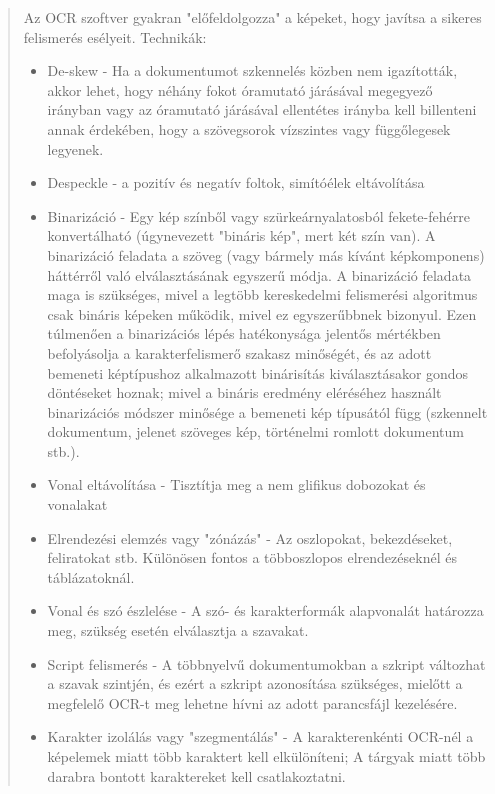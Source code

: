 \begin{quotation}
	Az OCR szoftver gyakran "előfeldolgozza" a képeket, hogy javítsa a sikeres felismerés esélyeit. Technikák:
	\begin{itemize}
		\item De-skew - Ha a dokumentumot szkennelés közben nem igazították, akkor lehet, hogy néhány fokot óramutató járásával megegyező irányban vagy az óramutató járásával ellentétes irányba
		kell billenteni annak érdekében, hogy a szövegsorok vízszintes vagy függőlegesek legyenek.
		
		\item Despeckle - a pozitív és negatív foltok, simítóélek eltávolítása
		
		\item Binarizáció - Egy kép színből vagy szürkeárnyalatosból fekete-fehérre konvertálható (úgynevezett "bináris kép", mert két szín van). A binarizáció feladata a szöveg (vagy bármely
		más kívánt képkomponens) háttérről való elválasztásának egyszerű módja. A binarizáció feladata maga is szükséges, mivel a legtöbb kereskedelmi felismerési algoritmus csak bináris képeken működik, mivel ez egyszerűbbnek bizonyul. Ezen túlmenően a binarizációs lépés hatékonysága jelentős mértékben befolyásolja a karakterfelismerő szakasz minőségét, és az adott bemeneti képtípushoz alkalmazott binárisítás kiválasztásakor gondos döntéseket hoznak; mivel a bináris eredmény eléréséhez használt binarizációs módszer minősége a bemeneti kép típusától függ (szkennelt dokumentum, jelenet szöveges kép, történelmi romlott dokumentum stb.).
		
		\item Vonal eltávolítása - Tisztítja meg a nem glifikus dobozokat és vonalakat
		
		\item Elrendezési elemzés vagy "zónázás" - Az oszlopokat, bekezdéseket, feliratokat stb. Különösen fontos a többoszlopos elrendezéseknél és táblázatoknál.
		
		\item Vonal és szó észlelése - A szó- és karakterformák alapvonalát határozza meg, szükség esetén elválasztja a szavakat.
		
		\item Script felismerés - A többnyelvű dokumentumokban a szkript változhat a szavak szintjén, és ezért a szkript azonosítása szükséges, mielőtt a megfelelő OCR-t meg lehetne hívni az
		adott parancsfájl kezelésére.
		
		\item Karakter izolálás vagy "szegmentálás" - A karakterenkénti OCR-nél a képelemek miatt több karaktert kell elkülöníteni; A tárgyak miatt több darabra bontott karaktereket kell
		csatlakoztatni.
		

\end{itemize}
\end{quotation}

